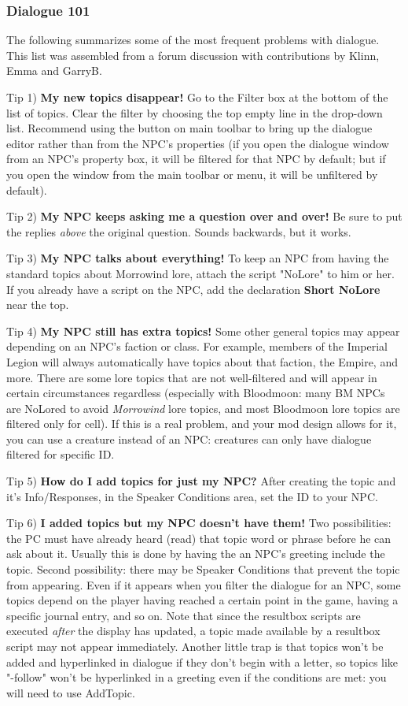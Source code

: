 \documentclass[
]{article}
\begin{document}
\hypertarget{dialogue-101}{%
\subsubsection{Dialogue 101}\label{dialogue-101}}

The following summarizes some of the most frequent problems with
dialogue. This list was assembled from a forum discussion with
contributions by Klinn, Emma and GarryB.

Tip 1) \textbf{My new topics disappear!} Go to the Filter box at the
bottom of the list of topics. Clear the filter by choosing the top empty
line in the drop-down list. Recommend using the button on main toolbar
to bring up the dialogue editor rather than from the NPC's properties
(if you open the dialogue window from an NPC's property box, it will be
filtered for that NPC by default; but if you open the window from the
main toolbar or menu, it will be unfiltered by default).

Tip 2) \textbf{My NPC keeps asking me a question over and over!} Be sure
to put the replies \emph{above} the original question. Sounds backwards,
but it works.

Tip 3) \textbf{My NPC talks about everything!} To keep an NPC from
having the standard topics about Morrowind lore, attach the script
"NoLore" to him or her. If you already have a script on the NPC, add the
declaration \textbf{Short NoLore} near the top.

Tip 4) \textbf{My NPC still has extra topics!} Some other general topics
may appear depending on an NPC's faction or class. For example, members
of the Imperial Legion will always automatically have topics about that
faction, the Empire, and more. There are some lore topics that are not
well-filtered and will appear in certain circumstances regardless
(especially with Bloodmoon: many BM NPCs are NoLored to avoid
\emph{Morrowind} lore topics, and most Bloodmoon lore topics are
filtered only for cell). If this is a real problem, and your mod design
allows for it, you can use a creature instead of an NPC: creatures can
only have dialogue filtered for specific ID.

Tip 5) \textbf{How do I add topics for just my NPC?} After creating the
topic and it's Info/Responses, in the Speaker Conditions area, set the
ID to your NPC.

Tip 6) \textbf{I added topics but my NPC doesn't have them!} Two
possibilities: the PC must have already heard (read) that topic word or
phrase before he can ask about it. Usually this is done by having the an
NPC's greeting include the topic. Second possibility: there may be
Speaker Conditions that prevent the topic from appearing. Even if it
appears when you filter the dialogue for an NPC, some topics depend on
the player having reached a certain point in the game, having a specific
journal entry, and so on. Note that since the resultbox scripts are
executed \emph{after} the display has updated, a topic made available by
a resultbox script may not appear immediately. Another little trap is
that topics won't be added and hyperlinked in dialogue if they don't
begin with a letter, so topics like "-follow" won't be hyperlinked in a
greeting even if the conditions are met: you will need to use AddTopic.
\end{document}
